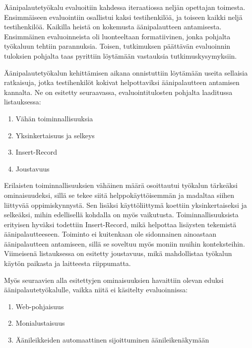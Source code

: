 \documentclass[utf8]{gradu3}
\begin{document}
Äänipalautetyökalu evaluoitiin kahdessa iteraatiossa neljän opettajan toimesta. Ensimmäiseen evaluointiin osallistui kaksi testihenkilöä, ja toiseen kaikki neljä testihenkilöä. Kaikilla heistä on kokemusta äänipalautteen antamisesta. Ensimmäinen evaluoinneista oli luonteeltaan formatiivinen, jonka pohjalta työkaluun tehtiin parannuksia. Toisen, tutkimuksen päättävän evaluoinnin tuloksien pohjalta taas pyrittiin löytämään vastauksia tutkimuskysymyksiin.

Äänipalautetyökalun kehittämisen aikana onnistuttiin löytämään useita sellaisia ratkaisuja, jotka testihenkilöt kokivat helpottaviksi äänipalautteen antamisen kannalta. Ne on esitetty seuraavassa, evaluointitulosten pohjalta laaditussa listauksessa:

\begin{enumerate}
  \item Vähän toiminnallisuuksia
  \item Yksinkertaisuus ja selkeys
  \item Insert-Record
  \item Joustavuus
\end{enumerate}

Erilaisten toiminnallisuuksien vähäinen määrä osoittautui työkalun tärkeäksi ominaisuudeksi, sillä se tekee siitä helppokäyttöisemmän ja madaltaa siihen liittyvää oppimiskynnystä. Sen lisäksi käyttöliittymä koettiin yksinkertaiseksi ja selkeäksi, mihin edellisellä kohdalla on myös vaikutusta. Toiminnallisuuksista erityisen hyväksi todettiin Insert-Record, mikä helpottaa lisäysten tekemistä äänipalautteeseen. Toiminto ei kuitenkaan ole sidonnainen ainoastaan äänipalautteen antamiseen, sillä se soveltuu myös moniin muihin konteksteihin. Viimeisenä listauksessa on esitetty joustavuus, mikä mahdollistaa työkalun käytön paikasta ja laitteesta riippumatta. 

Myös seuraavien alla esitettyjen ominaisuuksien havaittiin olevan eduksi äänipalautetyökalulle, vaikka niitä ei käsitelty evaluoinnissa:

\begin{enumerate}
  \item Web-pohjaisuus
  \item Monialustaisuus
  \item Äänileikkeiden automaattinen sijoittuminen äänileikenäkymään
\end{enumerate}
\end{document}
